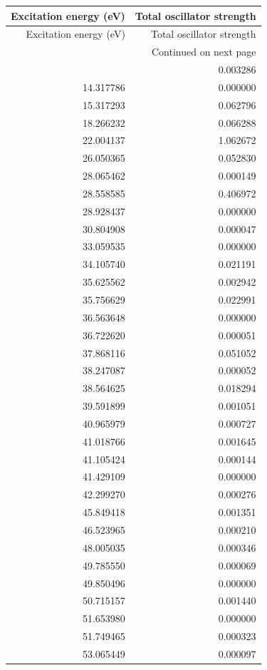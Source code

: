 \begin{longtable}{rr}
\toprule
Excitation energy (eV) & Total oscillator strength \\
\midrule
\endfirsthead
\toprule
Excitation energy (eV) & Total oscillator strength \\
\midrule
\endhead
\midrule
\multicolumn{2}{r}{Continued on next page} \\
\midrule
\endfoot
\bottomrule
\endlastfoot
11.638575 & 0.003286 \\
14.317786 & 0.000000 \\
15.317293 & 0.062796 \\
18.266232 & 0.066288 \\
22.004137 & 1.062672 \\
26.050365 & 0.052830 \\
28.065462 & 0.000149 \\
28.558585 & 0.406972 \\
28.928437 & 0.000000 \\
30.804908 & 0.000047 \\
33.059535 & 0.000000 \\
34.105740 & 0.021191 \\
35.625562 & 0.002942 \\
35.756629 & 0.022991 \\
36.563648 & 0.000000 \\
36.722620 & 0.000051 \\
37.868116 & 0.051052 \\
38.247087 & 0.000052 \\
38.564625 & 0.018294 \\
39.591899 & 0.001051 \\
40.965979 & 0.000727 \\
41.018766 & 0.001645 \\
41.105424 & 0.000144 \\
41.429109 & 0.000000 \\
42.299270 & 0.000276 \\
45.849418 & 0.001351 \\
46.523965 & 0.000210 \\
48.005035 & 0.000346 \\
49.785550 & 0.000069 \\
49.850496 & 0.000000 \\
50.715157 & 0.001440 \\
51.653980 & 0.000000 \\
51.749465 & 0.000323 \\
53.065449 & 0.000097 \\

\end{longtable}
